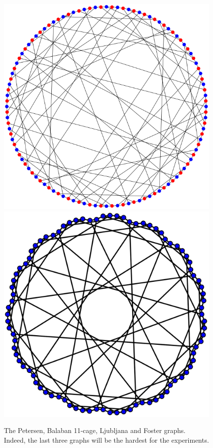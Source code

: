 \documentclass[11pt,a4paper]{article}
\begin{document}
\begin{center}
\begin{figure}[h!]
\hspace*{3mm}
\includegraphics[scale=0.20]{Ljubljana}
\hspace*{3mm}
\includegraphics[scale=0.10]{Foster}
\caption{The Petersen, Balaban 11-cage, Ljubljana and Foster graphs. Indeed, the last three graphs will be the hardest for the experiments.}
\end{figure}
\end{center}
\end{document}
